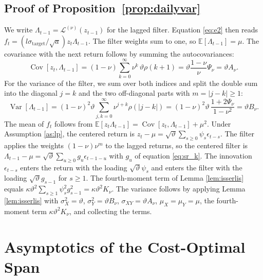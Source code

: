 \documentclass[hidelinks]{siamonline250211}
\DeclareMathOperator{\Var}{Var}
\DeclareMathOperator{\Cov}{Cov}
\begin{document}
\subsection{Proof of Proposition~\ref{prop:dailyvar}}\label{sec:dailyvar}
We write $\Lambda_{t-1}=\mathcal{L}^{(\nu)}(z_{t-1})$ for the lagged filter. Equation \eqref{eq:e2} then reads $f_{t}=\left(l\sigma_{\mathrm{target}}/\sqrt{a}\right) z_{t}\Lambda_{t-1}$. The filter weights sum to one, so $\mathbb{E}[\Lambda_{t-1}]=\mu$. The covariance with the next return follows by summing the autocovariances:
\begin{equation} \label{eq:sr_cov}
	\Cov\left[ z_{t}, \Lambda_{t-1} \right] = \left(1-\nu\right)\sum^{\infty}_{k=0}\nu^{k}\, \vartheta\rho(k+1) = \vartheta \frac{1-\nu}{\nu}\Psi_{\nu} = \vartheta A_{\nu}.
\end{equation}
For the variance of the filter, we sum over both indices and split the double sum into the diagonal $j=k$ and the two off-diagonal parts with $m=\left|j-k\right|\geq 1$:
\begin{equation} \label{eq:sr_varL}
	\Var\left[ \Lambda_{t-1} \right] = \left(1-\nu\right)^{2} \vartheta \sum^{\infty}_{j,k=0}\nu^{j+k}\rho(\left|j-k\right|) = \left(1-\nu\right)^{2} \vartheta\, \frac{1+2\Psi_{\nu}}{1-\nu^{2}} = \vartheta B_{\nu}.
\end{equation}
The mean of $f_{t}$ follows from $\mathbb{E}\left[z_{t}\Lambda_{t-1}\right]=\Cov\left[z_{t},\Lambda_{t-1}\right]+\mu^{2}$. Under Assumption \ref{as:lp}, the centered return is $z_{t}-\mu=\sqrt{\vartheta}\sum_{s\geq 0}\psi_{s}\epsilon_{t-s}$. The filter applies the weights $(1-\nu)\nu^{m}$ to the lagged returns, so the centered filter is $\Lambda_{t-1}-\mu=\sqrt{\vartheta}\sum_{u\geq 0}g_{u}\epsilon_{t-1-u}$ with $g_{u}$ of equation \eqref{eq:sr_k}. The innovation $\epsilon_{t-s}$ enters the return with the loading $\sqrt{\vartheta}\psi_{s}$ and enters the filter with the loading $\sqrt{\vartheta}g_{s-1}$ for $s\geq 1$. The fourth-moment term of Lemma \ref{lem:isserlis} equals $\kappa\vartheta^{2}\sum_{s\geq 1}\psi^{2}_{s}g^{2}_{s-1}=\kappa\vartheta^{2}K_{\nu}$. The variance follows by applying Lemma \ref{lem:isserlis} with $\sigma^{2}_{X}=\vartheta$, $\sigma^{2}_{Y}=\vartheta B_{\nu}$, $\sigma_{XY}=\vartheta A_{\nu}$, $\mu_{X}=\mu_{Y}=\mu$, the fourth-moment term $\kappa\vartheta^{2}K_{\nu}$, and collecting the terms.



\section{Asymptotics of the Cost-Optimal Span}\label{app:asym}
\end{document}
